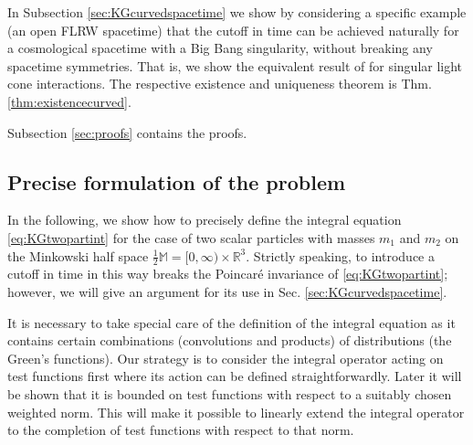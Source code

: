 \documentclass[b5paper,draft,openbib,12pt]{memoir}
\newcommand{\R}{\mathbb{R}}
\newcommand{\M}{\mathbb{M}}
\begin{document}
In Subsection \ref{sec:KGcurvedspacetime} we show by considering a 
specific example (an open FLRW spacetime) that the cutoff in time 
can be achieved naturally for a cosmological spacetime with a Big 
Bang singularity, without breaking any spacetime symmetries. That 
is, we show the equivalent result of \cite{lienertcurved} for 
singular light cone interactions. The respective existence and 
uniqueness theorem is Thm. \ref{thm:existencecurved}.

Subsection \ref{sec:proofs} contains the proofs.


\subsection{Precise formulation of the problem}
\label{sec:formulation}

In the following, we show how to precisely define the integral 
equation \eqref{eq:KGtwopartint} for the case of two scalar particles with 
masses $m_1$ and $m_2$ on the Minkowski half space $\frac{1}{2}\M = 
[0,\infty) \times \R^3$. Strictly speaking, to introduce a cutoff 
in time in this way breaks the Poincar\'e invariance of 
\eqref{eq:KGtwopartint}; however, we will give an argument for its use 
in Sec. \ref{sec:KGcurvedspacetime}.

It is necessary to take special care of the definition of the 
integral equation as it contains certain combinations (convolutions 
and products) of distributions (the Green's functions). Our strategy 
is to consider the integral operator acting on test functions first 
where its action can be defined straightforwardly. Later it will be 
shown that it is bounded on test functions with respect to a suitably 
chosen weighted norm. This will make it possible to linearly extend 
the integral operator to the completion of test functions with 
respect to that norm.
\end{document}
